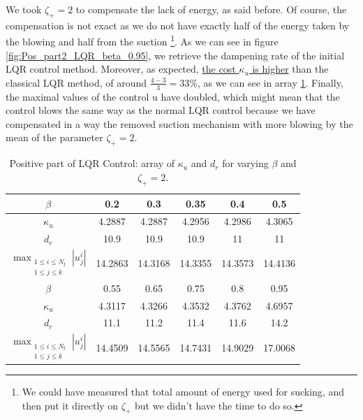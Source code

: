 \documentclass[12pt]{article}
\begin{document}
We took $\zeta_+ =2$ to compensate the lack of energy, as said before. Of course, the compensation is not exact
as we do not have exactly half of the energy taken by the blowing and half from the suction \footnote{ We could have measured 
that total amount of energy used for sucking, and then put it directly on $\zeta_+$ but we didn't have the time to do
so.}. As we can see in figure \ref{fig:Pos_part2_LQR_beta_0.95}, we retrieve the dampening rate of the initial LQR control method.
Moreover, as expected, \underline{the cost $\kappa_u $ is higher} than the classical LQR method, of around \underline{$\frac{4-3}{3} = 33\%$}, as we can see in array \ref{tab:LQR_cost_beta_pospart}. Finally, the maximal values of the control u have doubled, which might mean that the control blows the same way as the normal LQR control because we  have compensated in a way the removed suction mechanism with more blowing by the mean of the parameter $\zeta_+=2.$
\\
\begin{table}[ht]
    \caption{Positive part of LQR Control: array of $\kappa_u$ and $d_r$ for varying $\beta$ and $\zeta_+ = 2$.}
    \label{tab:LQR_cost_beta_pospart}
    \centering
        \begin{tabular}{ |c|c|c|c|c|c| }
        \hline
        $\beta$ & 0.2 & 0.3 & 0.35 & 0.4 & 0.5 \\
        \hline
        $\kappa_u$ & 4.2887 & 4.2887 & 4.2956 & 4.2986 &4.3065 \\ 
        $d_r$ & 10.9 & 10.9 & 10.9 & 11 & 11\\
        $\max_{\substack{1\leq i \leq N_t \\ 1\leq j \leq k}}|u_j^i|$  &14.2863 & 14.3168& 14.3355& 14.3573&14.4136\\
        \hline
        $\beta$ & 0.55 & 0.65 & 0.75 & 0.8 & 0.95 \\
        \hline
        $\kappa_u$ & 4.3117 & 4.3266 & 4.3532 & 4.3762 & 4.6957 \\ 
        $d_r$ & 11.1 & 11.2 & 11.4 & 11.6 & 14.2\\
        $\max_{\substack{1\leq i \leq N_t \\ 1\leq j \leq k}}|u_j^i|$  &14.4509 & 14.5565& 14.7431& 14.9029&17.0068\\
        \hline
        \end{tabular}
\end{table}
\end{document}
